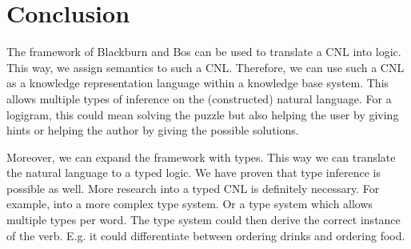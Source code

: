 \section{Conclusion}
The framework of Blackburn and Bos can be used to translate a CNL into logic. This way, we assign semantics to such a CNL. Therefore, we can use such a CNL as a knowledge representation language within a knowledge base system. This allows multiple types of inference on the (constructed) natural language. For a logigram, this could mean solving the puzzle but also helping the user by giving hints or helping the author by giving the possible solutions.

Moreover, we can expand the framework with types. This way we can translate the natural language to a typed logic. We have proven that type inference is possible as well. More research into a typed CNL is definitely necessary. For example, into a more complex type system. Or a type system which allows multiple types per word. The type system could then derive the correct instance of the verb. E.g. it could differentiate between ordering drinks and ordering food.
